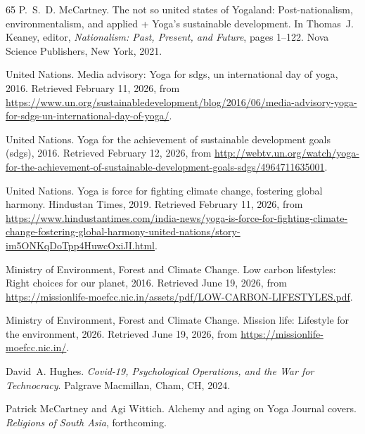 \documentclass[11pt]{article}
\begin{document}
\begin{thebibliography}{65}
P.~S.~D. McCartney.
\newblock The not so united states of {Yogaland}: Post-nationalism,
  environmentalism, and applied + {Yoga’s} sustainable development.
\newblock In Thomas~J. Keaney, editor, \emph{Nationalism: Past, Present, and
  Future}, pages 1--122. Nova Science Publishers, New York, 2021.

{United Nations}.
\newblock Media advisory: Yoga for sdgs, un international day of yoga,
  2016{}.
\newblock Retrieved February 11, 2026, from
  \url{https://www.un.org/sustainabledevelopment/blog/2016/06/media-advisory-yoga-for-sdgs-un-international-day-of-yoga/}.

{United Nations}.
\newblock Yoga for the achievement of sustainable development goals (sdgs),
  2016{}.
\newblock Retrieved February 12, 2026, from \url{
  http://webtv.un.org/watch/yoga-for-the-achievement-of-sustainable-development-goals-sdgs/4964711635001}.

{United Nations}.
\newblock Yoga is force for fighting climate change, fostering global harmony.
\newblock Hindustan Times, 2019.
\newblock Retrieved February 11, 2026, from
  \url{https://www.hindustantimes.com/india-news/yoga-is-force-for-fighting-climate-change-fostering-global-harmony-united-nations/story-im5ONKqDoTpp4HuwcOxiJI.html}.

{Ministry of Environment, Forest and Climate Change}.
\newblock Low carbon lifestyles: Right choices for our planet, 2016.
\newblock Retrieved June 19, 2026, from
  \url{https://missionlife-moefcc.nic.in/assets/pdf/LOW-CARBON-LIFESTYLES.pdf}.

{Ministry of Environment, Forest and Climate Change}.
\newblock Mission life: Lifestyle for the environment, 2026.
\newblock Retrieved June 19, 2026, from
  \url{https://missionlife-moefcc.nic.in/}.

David~A. Hughes.
\newblock \emph{{Covid-19}, Psychological Operations, and the War for
  Technocracy}.
\newblock Palgrave Macmillan, Cham, CH, 2024.

Patrick McCartney and Agi Wittich.
\newblock Alchemy and aging on {Yoga Journal} covers.
\newblock \emph{Religions of South Asia}, forthcoming.


\end{thebibliography}
\end{document}
